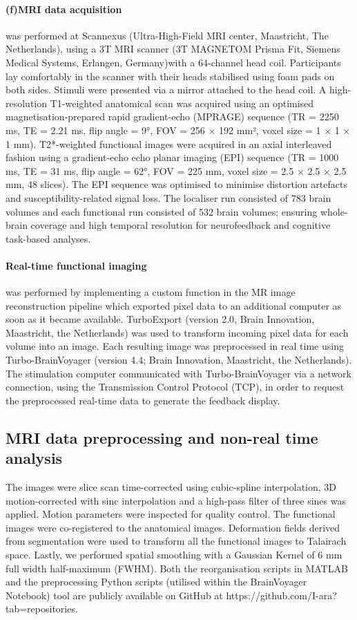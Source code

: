 \documentclass[]{imag-ms-template}
\begin{document}
\paragraph{(f)MRI data acquisition} was performed at Scannexus (Ultra-High-Field MRI center, Maastricht, The Netherlands), using a 3T MRI scanner (3T MAGNETOM Prisma Fit, Siemens Medical Systems, Erlangen, Germany)with a 64-channel head coil. Participants lay comfortably in the scanner with their heads stabilised using foam pads on both sides. Stimuli were presented via a mirror attached to the head coil.
A high-resolution T1-weighted anatomical scan was acquired using an optimised magnetisation-prepared rapid gradient-echo (MPRAGE) sequence (TR = 2250 ms, TE = 2.21 ms, flip angle = 9°, FOV = 256 × 192 mm², voxel size = 1 × 1 × 1 mm). T2*-weighted functional images were acquired in an axial interleaved fashion using a gradient-echo echo planar imaging (EPI) sequence (TR = 1000 ms, TE = 31 ms, flip angle = 62°, FOV = 225 mm, voxel size = 2.5 × 2.5 × 2.5 mm, 48 slices). The EPI sequence was optimised to minimise distortion artefacts and susceptibility-related signal loss. The localiser run consisted of 783 brain volumes and each functional run consisted of 532 brain volumes; ensuring whole-brain coverage and high temporal resolution for neurofeedback and cognitive task-based analyses.

\paragraph{Real-time functional imaging} was performed by implementing a custom function in the MR image reconstruction pipeline which exported pixel data to an additional computer as soon as it became available. TurboExport (version 2.0, Brain Innovation, Maastricht, the Netherlands) was used to transform incoming pixel data for each volume into an image. Each resulting image was preprocessed in real time using Turbo-BrainVoyager (version 4.4; Brain Innovation, Maastricht, the Netherlands). The stimulation computer communicated with Turbo-BrainVoyager via a network connection, using the Transmission Control Protocol (TCP), in order to request the preprocessed real-time data to generate the feedback display.

\subsection{MRI data preprocessing and non-real time analysis}
The images were slice scan time-corrected using cubic-spline interpolation, 3D motion-corrected with sinc interpolation and a high-pass filter of three sines was applied. Motion parameters were inspected for quality control. The functional images were co-registered to the anatomical images. Deformation fields derived from segmentation were used to transform all the functional images to Talairach space. Lastly, we performed spatial smoothing with a Gaussian Kernel of 6 mm full width half-maximum (FWHM). Both the reorganisation scripts in MATLAB and the preprocessing Python scripts (utilised within the BrainVoyager Notebook) tool are publicly available on GitHub at https://github.com/I-ara?tab=repositories.
\end{document}

